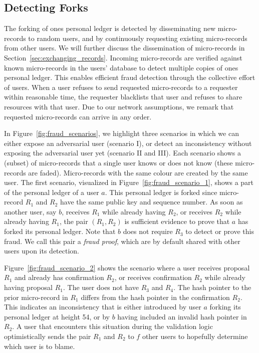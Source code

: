 
\subsection{Detecting Forks}
The forking of ones personal ledger is detected by disseminating new micro-records to random users, and by continuously requesting existing micro-records from other users.
We will further discuss the dissemination of micro-records in Section~\ref{sec:exchanging_records}.
Incoming micro-records are verified against known micro-records in the users' database to detect multiple copies of ones personal ledger.
This enables efficient fraud detection through the collective effort of users.
When a user refuses to send requested micro-records to a requester within reasonable time, the requester blacklists that user and refuses to share resources with that user.
Due to our network assumptions, we remark that requested micro-records can arrive in any order.

In Figure~\ref{fig:fraud_scenarios}, we highlight three scenarios in which we can either expose an adversarial user (scenario I), or detect an inconsistency without exposing the adversarial user yet (scenario II and III).
Each scenario shows a (subset) of micro-records that a single user knows or does not know (these micro-records are faded).
Micro-records with the same colour are created by the same user.
The first scenario, visualized in Figure~\ref{fig:fraud_scenario_1}, shows a part of the personal ledger of a user $ a $.
This personal ledger is forked since micro-record $ R_1 $ and $ R_2 $ have the same public key and sequence number.
As soon as another user, say $ b $, receives $ R_1 $ while already having $ R_2 $, or receives $ R_2 $ while already having $ R_1 $, the pair $ (R_1, R_2) $ is sufficient evidence to prove that $ a $ has forked its personal ledger.
Note that $ b $ does not require $ R_3 $ to detect or prove this fraud.
We call this pair a \emph{fraud proof}, which are by default shared with other users upon its detection.

Figure~\ref{fig:fraud_scenario_2} shows the scenario where a user receives proposal $ R_1 $ and already has confirmation $ R_2 $, or receives confirmation $ R_2 $ while already having proposal $ R_1 $.
The user does not have $ R_3 $ and $ R_4 $.
The hash pointer to the prior micro-record in $ R_1 $ differs from the hash pointer in the confirmation $ R_2 $.
This indicates an inconsistency that is either introduced by user $ a $ forking its personal ledger at height 54, or by $ b $ having included an invalid hash pointer in $ R_2 $.
A user that encounters this situation during the validation logic optimistically sends the pair $ R_1 $ and $ R_2 $ to $ f $ other users to hopefully determine which user is to blame.

